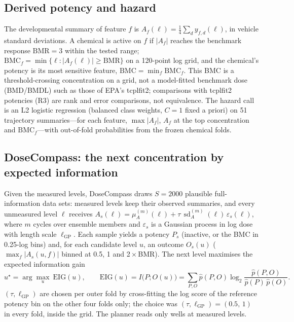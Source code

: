 \documentclass[11pt,a4paper]{article}
\newcommand{\DC}{DoseCompass}
\begin{document}
\subsection{Derived potency and hazard}\label{sec:potency-def}
The developmental summary of feature \(f\) is \(A_f(\ell)=\tfrac14\sum_{d}y_{f,d}(\ell)\), in vehicle standard
deviations. A chemical is active on \(f\) if \(|A_f|\) reaches the benchmark response \(\mathrm{BMR}=3\)
within the tested range; \(\mathrm{BMC}_f=\min\{\ell:|A_f(\ell)|\ge\mathrm{BMR}\}\) on a 120-point log grid, and
the chemical's potency is its most sensitive feature, \(\mathrm{BMC}=\min_f\mathrm{BMC}_f\). This BMC is a
threshold-crossing concentration on a grid, not a model-fitted benchmark dose (BMD/BMDL) such as those of EPA's
tcplfit2; comparisons with tcplfit2 potencies (R3) are rank and error comparisons, not equivalence. The hazard call is
an L2 logistic regression (balanced class weights, \(C=1\) fixed a priori) on 51 trajectory summaries---for each
feature, \(\max|A_f|\), \(A_f\) at the top concentration and \(\mathrm{BMC}_f\)---with out-of-fold
probabilities from the frozen chemical folds.

\subsection{DoseCompass: the next concentration by expected information}
Given the measured levels, \DC{} draws \(S=2000\) plausible
full-information data sets: measured levels keep their observed summaries, and every unmeasured level
\(\ell\) receives \(A_s(\ell)=\mu^{(m)}_A(\ell)+\tau\,\operatorname{sd}^{(m)}_A(\ell)\,\varepsilon_s(\ell)\),
where \(m\) cycles over ensemble members and \(\varepsilon_s\) is a Gaussian process in log dose with length
scale \(\ell_{\mathrm{GP}}\). Each sample yields a potency \(P_s\) (inactive, or the BMC in
0.25-log bins) and, for each candidate level \(u\), an outcome
\(O_s(u)\) (\(\max_f|A_s(u,f)|\) binned at 0.5,
1 and
2\,\(\times\)\,BMR). The next level maximises the expected
information gain~\cite{lindley1956measure,chaloner1995bayesian}
\begin{equation}\label{eq:eig}
  u^\star=\arg\max_u\ \mathrm{EIG}(u),\qquad \mathrm{EIG}(u)=I\big(P;O(u)\big)=\sum_{P,O}\hat p(P,O)\log_2\frac{\hat p(P,O)}{\hat p(P)\,\hat p(O)}.
\end{equation}
\((\tau,\ell_{\mathrm{GP}})\) are chosen per outer fold by cross-fitting the log score of the reference
potency bin on the other four folds only; the choice was
\((\tau,\ell_{\mathrm{GP}})=(0.5,\,1)\)
in every fold, inside the grid. The planner reads only wells at measured levels.
\end{document}
